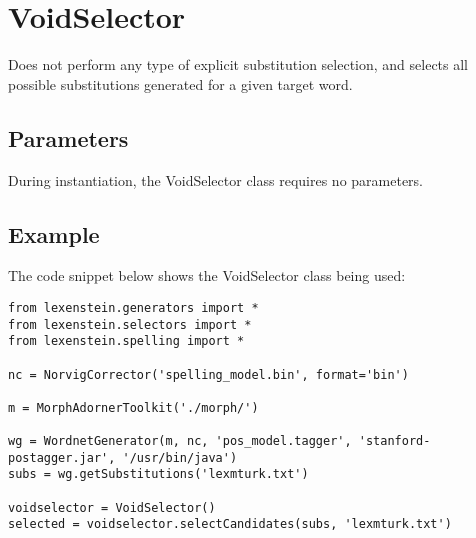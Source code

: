 \section{VoidSelector}

Does not perform any type of explicit substitution selection, and selects all possible substitutions generated for a given target word.

\subsection{Parameters}

During instantiation, the VoidSelector class requires no parameters.

\subsection{Example}

The code snippet below shows the VoidSelector class being used:

\begin{lstlisting}
from lexenstein.generators import *
from lexenstein.selectors import *
from lexenstein.spelling import *

nc = NorvigCorrector('spelling_model.bin', format='bin')

m = MorphAdornerToolkit('./morph/')

wg = WordnetGenerator(m, nc, 'pos_model.tagger', 'stanford-postagger.jar', '/usr/bin/java')
subs = wg.getSubstitutions('lexmturk.txt')

voidselector = VoidSelector()
selected = voidselector.selectCandidates(subs, 'lexmturk.txt')
\end{lstlisting}